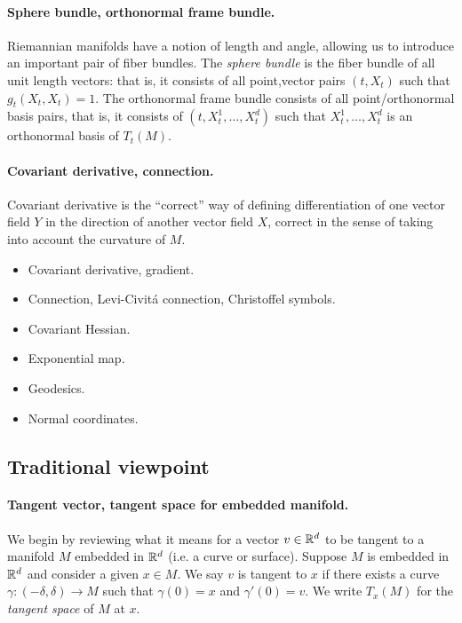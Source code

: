 \documentclass{article}
\newcommand{\ag}[1]{{\bf{{\red{[{AG: #1}]}}}}}
\begin{document}
	\paragraph{Sphere bundle, orthonormal frame bundle.}
	Riemannian manifolds have a notion of length and angle, allowing us to introduce an important pair of fiber bundles. The \emph{sphere bundle} is the fiber bundle of all unit length vectors: that is, it consists of all point,vector pairs $(t,X_t)$ such that $g_t(X_t,X_t) = 1$.  The orthonormal frame bundle consists of all point/orthonormal basis pairs, that is, it consists of $(t,X_{t}^1,\ldots,X_{t}^d)$ such that $X_t^1,\ldots,X_t^d$ is an orthonormal basis of $T_t(M)$. 
	
	\paragraph{Covariant derivative, connection.}
	Covariant derivative is the ``correct'' way of defining differentiation of one vector field $Y$ in the direction of another vector field $X$, correct in the sense of taking into account the curvature of $M$.  
	
	\ag{TO COME}

	
	
	
	\begin{itemize}
		\item Covariant derivative, gradient.
		\item Connection,  Levi-Civit\'{a} connection, Christoffel symbols.
		\item Covariant Hessian.
		\item Exponential map.
		\item Geodesics.
		\item Normal coordinates.
	\end{itemize}
	
	
	\subsection{Traditional viewpoint}
	\label{subsec:traditional-viewpoint}
	\paragraph{Tangent vector, tangent space for embedded manifold.}
	We begin by reviewing what it means for a vector $v \in \mathbb{R}^d$ to be tangent to a manifold $M$ embedded in $\mathbb{R}^d$ (i.e. a curve or surface). Suppose $M$ is embedded in $\mathbb{R}^d$ and consider a given $x \in M$. We say $v$ is tangent to $x$ if there exists a curve $\gamma: (-\delta,\delta) \to M$ such that $\gamma(0) = x$ and $\gamma'(0) = v$. We write $T_x(M)$ for the \emph{tangent space} of $M$ at $x$.
	
\end{document}
